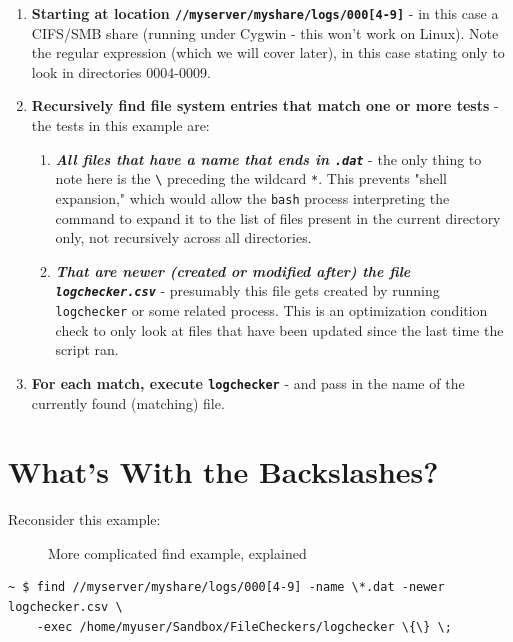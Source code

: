 \documentclass[10pt,]{book}
\numberwithin{figure}{chapter}
\DeclareRobustCommand{\drcap}[1]{\begin{figure}[H]\caption{#1}\end{figure}}
\begin{document}
\begin{enumerate}
\def\labelenumi{\arabic{enumi}.}
\item
  \textbf{Starting at location
  \texttt{//myserver/myshare/logs/000{[}4-9{]}}} - in this case a
  CIFS/SMB share (running under Cygwin - this won't work on Linux). Note
  the regular expression (which we will cover later), in this case
  stating only to look in directories 0004-0009.
\item
  \textbf{Recursively find file system entries that match one or more
  tests} - the tests in this example are:

  \begin{enumerate}
  \def\labelenumii{\alph{enumii}.}
  \item
    \textbf{\emph{All files that have a name that ends in
    \texttt{.dat}}} - the only thing to note here is the
    \texttt{\textbackslash{}} preceding the wildcard \texttt{*}. This
    prevents "shell expansion," which would allow the \texttt{bash}
    process interpreting the command to expand it to the list of files
    present in the current directory only, not recursively across all
    directories.
  \item
    \textbf{\emph{That are newer (created or modified after) the file
    \texttt{logchecker.csv}}} - presumably this file gets created by
    running \texttt{logchecker} or some related process. This is an
    optimization condition check to only look at files that have been
    updated since the last time the script ran.
  \end{enumerate}
\item
  \textbf{For each match, execute \texttt{logchecker}} - and pass in the
  name of the currently found (matching) file.
\end{enumerate}

\section*{What's With the
Backslashes?}\label{whats-with-the-backslashes}

Reconsider this example:

\drcap{More complicated find example, explained}

\begin{verbatim}
~ $ find //myserver/myshare/logs/000[4-9] -name \*.dat -newer logchecker.csv \
    -exec /home/myuser/Sandbox/FileCheckers/logchecker \{\} \;
\end{verbatim}
\end{document}
